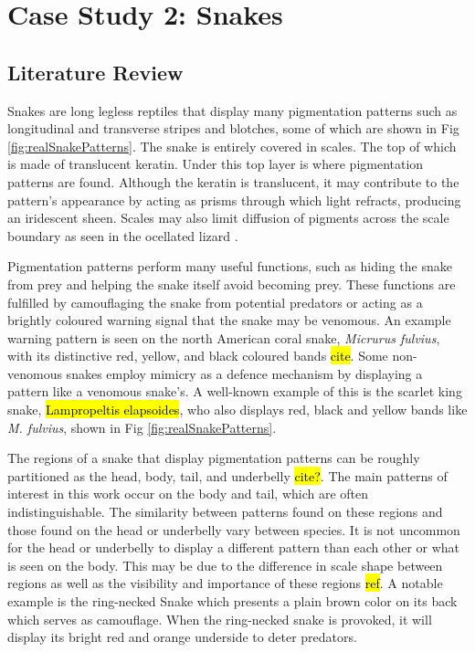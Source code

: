\chapter{Case Study 2: Snakes}
\section{Literature Review}
Snakes are long legless reptiles that display many pigmentation patterns such as longitudinal and transverse stripes and blotches, some of which are shown in Fig \ref{fig:realSnakePatterns}. The snake is entirely covered in scales. The top of which is made of translucent keratin. Under this top layer is where pigmentation patterns are found. Although the keratin is translucent, it may contribute to the pattern's appearance by acting as prisms through which light refracts, producing an iridescent sheen. Scales may also limit diffusion of pigments across the scale boundary as seen in the ocellated lizard \cite{manukyan2017}.

Pigmentation patterns perform many useful functions, such as hiding the snake from prey and helping the snake itself avoid becoming prey. These functions are fulfilled by camouflaging the snake from potential predators or acting as a brightly coloured warning signal that the snake may be venomous. An example warning pattern is seen on the north American coral snake, \textit{Micrurus fulvius}, with its distinctive red, yellow, and black coloured bands \hl{cite}. Some non-venomous snakes employ mimicry as a defence mechanism by displaying a pattern like a venomous snake’s. A well-known example of this is the scarlet king snake, \hl{Lampropeltis elapsoides}, who also displays red, black and yellow bands like \textit{M. fulvius}, shown in Fig \ref{fig:realSnakePatterns}.

The regions of a snake that display pigmentation patterns can be roughly partitioned as the head, body, tail, and underbelly \hl{cite?}. The main patterns of interest in this work occur on the body and tail, which are often indistinguishable. The similarity between patterns found on these regions and those found on the head or underbelly vary between species. It is not uncommon for the head or underbelly to display a different pattern than each other or what is seen on the body. This may be due to the difference in scale shape between regions as well as the visibility and importance of these regions \hl{ref}. A notable example is the ring-necked Snake which presents a plain brown color on its back which serves as camouflage. When the ring-necked snake is provoked, it will display its bright red and orange underside to deter predators.


